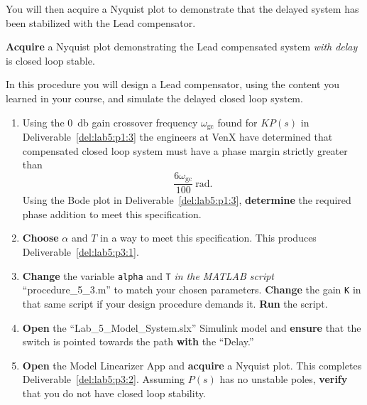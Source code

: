 %
You will then acquire a Nyquist plot to demonstrate that the delayed system has been stabilized with the Lead compensator.
%
\begin{deliverable}[label={del:lab5:p3:2}]
  \textbf{Acquire} a Nyquist plot demonstrating the Lead compensated system \emph{with delay} is closed loop stable.
\end{deliverable}
%
\begin{procedure}[label={proc:lab5:3}]
  In this procedure you will design a Lead compensator, using the content you learned in your course, and simulate the delayed closed loop system.
  \begin{enumerate}[label={(\arabic*)}]
    \item{%
      Using the \SI{0}{\decibel} gain crossover frequency \(\omega_\mathrm{gc}\) found for \(K P(s)\) in Deliverable~\ref{del:lab5:p1:3} the engineers at VenX have determined that compensated closed loop system must have a phase margin strictly greater than
      \[
        \frac{6\omega_\mathrm{gc}}{100}~\mathrm{rad}.
      \]
      Using the Bode plot in Deliverable~\ref{del:lab5:p1:3}, \textbf{determine} the required phase addition to meet this specification.
    }
    \item{%
      \textbf{Choose} \(\alpha\) and \(T\) in a way to meet this specification.
      This produces Deliverable~\ref{del:lab5:p3:1}.
    }
    \item{%
      \textbf{Change} the variable \texttt{alpha} and \texttt{T} \emph{in the MATLAB script} ``procedure\_5\_3.m'' to match your chosen parameters.
      \textbf{Change} the gain \texttt{K} in that same script if your design procedure demands it.
      \textbf{Run} the script.
    }
    \item{%
      \textbf{Open} the ``Lab\_5\_Model\_System.slx'' Simulink model and \textbf{ensure} that the switch is pointed towards the path \textbf{with} the ``Delay.''
    }
    \item{%
      \textbf{Open} the Model Linearizer App and \textbf{acquire} a Nyquist plot.
      This completes Deliverable~\ref{del:lab5:p3:2}.
      Assuming \(P(s)\) has no unstable poles, \textbf{verify} that you do not have closed loop stability.
    }
  \end{enumerate}
\end{procedure}

